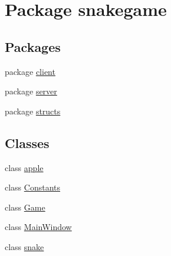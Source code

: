 \hypertarget{namespacesnakegame}{}\section{Package snakegame}
\label{namespacesnakegame}
\subsection*{Packages}
\begin{DoxyCompactItemize}
\item 
package \mbox{\hyperlink{namespacesnakegame_1_1client}{client}}
\item 
package \mbox{\hyperlink{namespacesnakegame_1_1server}{server}}
\item 
package \mbox{\hyperlink{namespacesnakegame_1_1structs}{structs}}
\end{DoxyCompactItemize}
\subsection*{Classes}
\begin{DoxyCompactItemize}
\item 
class \mbox{\hyperlink{classsnakegame_1_1apple}{apple}}
\item 
class \mbox{\hyperlink{classsnakegame_1_1_constants}{Constants}}
\item 
class \mbox{\hyperlink{classsnakegame_1_1_game}{Game}}
\item 
class \mbox{\hyperlink{classsnakegame_1_1_main_window}{Main\+Window}}
\item 
class \mbox{\hyperlink{classsnakegame_1_1snake}{snake}}
\end{DoxyCompactItemize}
